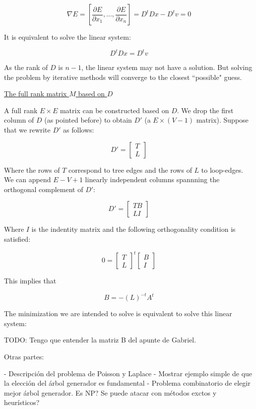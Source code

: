 \documentclass[a4paper,11pt]{article}
\begin{document}
$$\nabla E = [\frac{\partial E}{\partial x_1}, \dots, \frac{\partial 
E}{\partial x_n}] = D^tDx-D^tv=0$$

It is equivalent to solve the linear system:

$$D^tDx = D^tv$$

As the rank of $D$ is $n-1$, the linear system may not have a solution. 
But solving the problem by iterative methods will converge to the 
closest ``possible" guess.

\bigskip

\underline{The full rank matrix $M$ based on $D$}

\bigskip

A full rank $E \times E$ matrix can be constructed based on $D$. We 
drop the first column of $D$ (as pointed before) to obtain $D'$ (a $E 
\times (V-1)$ matrix). Suppose that we rewrite $D'$ as follows:

\begin{equation}
     D'=\begin{bmatrix}
         T \\
         L
	\end{bmatrix}
 \end{equation}

Where the rows of $T$ correspond to tree edges and the rows of $L$ to 
loop-edges. We can append $E-V+1$ linearly independent columns 
spannning the orthogonal complement of $D'$:

\begin{equation}
     D'=\begin{bmatrix}
         T B\\
         L I
	\end{bmatrix}
\end{equation}

Where $I$ is the indentity matrix and the following orthogonality 
condition is satisfied: 

\begin{equation}
     0=\begin{bmatrix}
         T \\
         L
	\end{bmatrix}^t
	\begin{bmatrix}
         B\\
         I
	\end{bmatrix}
\end{equation}

This implies that

$$B = -(L)^{-t}A^t$$

The minimization we are intended to solve is equivalent to solve this 
linear system:

\newpage

TODO: Tengo que entender la matriz B del apunte de Gabriel.


Otras partes:

- Descripción del problema de Poisson y Laplace
- Mostrar ejemplo simple de que la elección del árbol generador es 
fundamental
- Problema combinatorio de elegir mejor árbol generador. Es NP? Se puede 
atacar con métodos exctos y heurísticos?
\end{document}
